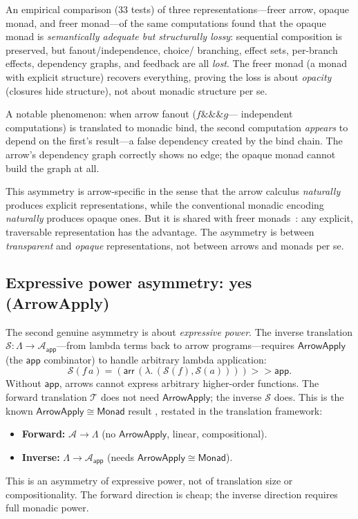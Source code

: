 \documentclass[11pt,a4paper]{article}
\theoremstyle{definition}
\theoremstyle{remark}
\newcommand{\arr}{\mathsf{arr}}
\newcommand{\comp}{\mathbin{>\!\!>}}
\newcommand{\app}{\mathsf{app}}
\newcommand{\ArrowApply}{\mathsf{ArrowApply}}
\newcommand{\T}{\mathcal{T}}
\newcommand{\Sinv}{\mathcal{S}}
\newcommand{\lamterm}{\Lambda}
\newcommand{\arrowprog}{\mathcal{A}}
\begin{document}
An empirical comparison (33 tests) of three representations---freer arrow,
opaque monad, and freer monad---of the same computations found that the
opaque monad is \emph{semantically adequate but structurally lossy}:
sequential composition is preserved, but fanout/independence, choice/
branching, effect sets, per-branch effects, dependency graphs, and feedback
are all \emph{lost}. The freer monad (a monad with explicit structure)
recovers everything, proving the loss is about \emph{opacity} (closures
hide structure), not about monadic structure per se.

A notable phenomenon: when arrow fanout ($f \mathbin{\&\&\&} g$---
independent computations) is translated to monadic bind, the second
computation \emph{appears} to depend on the first's result---a false
dependency created by the bind chain. The arrow's dependency graph
correctly shows no edge; the opaque monad cannot build the graph at all.

This asymmetry is arrow-specific in the sense that the arrow calculus
\emph{naturally} produces explicit representations, while the conventional
monadic encoding \emph{naturally} produces opaque ones. But it is shared
with freer monads~\cite{kiselyov2013freer}: any explicit, traversable
representation has the advantage. The asymmetry is between
\emph{transparent} and \emph{opaque} representations, not between arrows
and monads per se.

\subsection{Expressive power asymmetry: yes (ArrowApply)}

The second genuine asymmetry is about \emph{expressive power}. The inverse
translation $\Sinv : \lamterm \to \arrowprog_{\app}$---from lambda terms
back to arrow programs---requires $\ArrowApply$ (the $\app$ combinator) to
handle arbitrary lambda application:
\begin{equation}\label{eq:inverse-app}
  \Sinv(f\,a) = (\arr\,(\lambda.\, (\Sinv(f), \Sinv(a)))) \comp \app.
\end{equation}
Without $\app$, arrows cannot express arbitrary higher-order functions. The
forward translation $\T$ does not need $\ArrowApply$; the inverse $\Sinv$
does. This is the known $\ArrowApply \cong \mathsf{Monad}$ result
\cite{lindley2010embedding}, restated in the translation framework:
\begin{itemize}
\item \textbf{Forward:} $\arrowprog \to \lamterm$ (no $\ArrowApply$, linear, compositional).
\item \textbf{Inverse:} $\lamterm \to \arrowprog_{\app}$ (needs $\ArrowApply \cong \mathsf{Monad}$).
\end{itemize}
This is an asymmetry of expressive power, not of translation size or
compositionality. The forward direction is cheap; the inverse direction
requires full monadic power.
\end{document}
